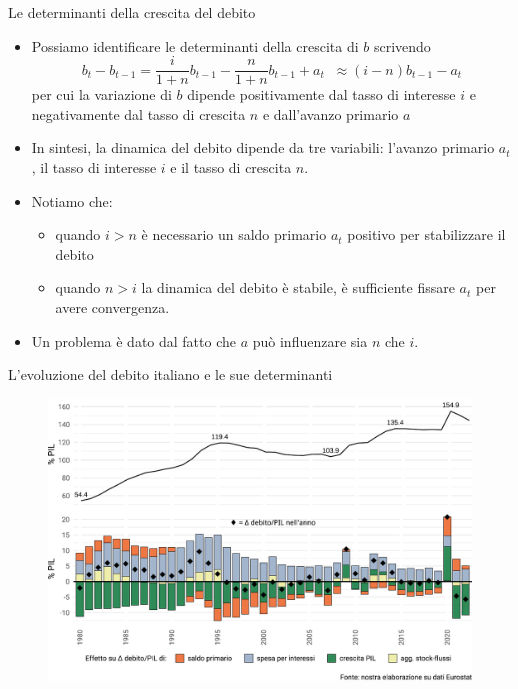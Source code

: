 \documentclass[aspectratio=149,11pt,italian]{beamer}
\begin{document}
\begin{frame}{Le determinanti della crescita del debito}

  \begin{itemize}
  \item Possiamo identificare le determinanti della crescita di $b$ scrivendo
    \begin{equation*}
      b_{t}-b_{t-1}=\frac{i}{1+n}b_{t-1}-\frac{n}{1+n}b_{t-1}+a_{t}
      \;\;\approx (i-n)b_{t-1}-a_{t}
    \end{equation*}
    per cui la variazione di $b$ dipende positivamente dal tasso di interesse
    $i$ e negativamente dal tasso di crescita $n$ e dall'avanzo primario $a$
  \item In sintesi, la dinamica del debito dipende da tre variabili: l'avanzo
    primario $a_t$, il tasso di interesse $i$ e il tasso di crescita $n$.
  \item Notiamo che:
    \begin{itemize}
    \item quando $i>n$ è necessario un saldo primario $a_t$ positivo per
      stabilizzare il debito
    \item quando $n>i$ la dinamica del debito è stabile, è sufficiente fissare
      $a_t$ per avere convergenza.
    \end{itemize}
  \item Un problema è dato dal fatto che $a$ può influenzare sia $n$ che $i$.
  \end{itemize}
\end{frame}

\begin{frame}{L'evoluzione del debito italiano e le sue determinanti}

  \begin{figure}
    \centering
    \includegraphics[width=.9\textwidth]{./figure/crescita-debito-1980-2024-scomposizione-nominale-color.pdf}
  \end{figure}
\end{frame}
\end{document}
